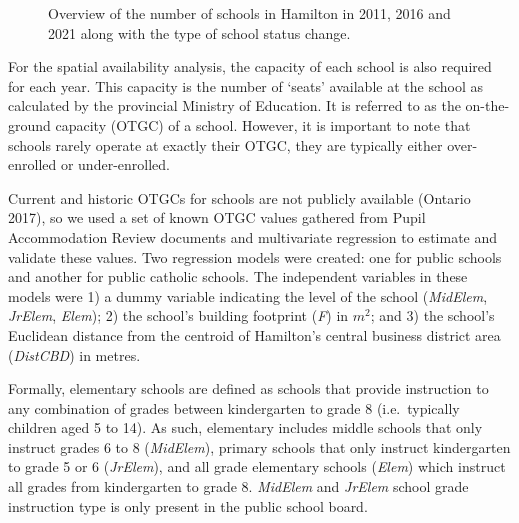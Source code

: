 \documentclass[
default
]{sn-jnl}
\begin{document}
\begin{figure}


\caption{\label{fig-Fig1}Overview of the number of schools in Hamilton
in 2011, 2016 and 2021 along with the type of school status change.}

\end{figure}%

For the spatial availability analysis, the capacity of each school is
also required for each year. This capacity is the number of `seats'
available at the school as calculated by the provincial Ministry of
Education. It is referred to as the on-the-ground capacity (OTGC) of a
school. However, it is important to note that schools rarely operate at
exactly their OTGC, they are typically either over-enrolled or
under-enrolled.

Current and historic OTGCs for schools are not publicly available
(Ontario 2017), so we used a set of known OTGC values gathered from
Pupil Accommodation Review documents and multivariate regression to
estimate and validate these values. Two regression models were created:
one for public schools and another for public catholic schools. The
independent variables in these models were 1) a dummy variable
indicating the level of the school (\emph{MidElem}, \emph{JrElem},
\emph{Elem}); 2) the school's building footprint (\emph{F}) in \(m^2\);
and 3) the school's Euclidean distance from the centroid of Hamilton's
central business district area (\emph{DistCBD}) in metres.

Formally, elementary schools are defined as schools that provide
instruction to any combination of grades between kindergarten to grade 8
(i.e.~typically children aged 5 to 14). As such, elementary includes
middle schools that only instruct grades 6 to 8 (\emph{MidElem}),
primary schools that only instruct kindergarten to grade 5 or 6
(\emph{JrElem}), and all grade elementary schools (\emph{Elem}) which
instruct all grades from kindergarten to grade 8. \emph{MidElem} and
\emph{JrElem} school grade instruction type is only present in the
public school board.
\end{document}
